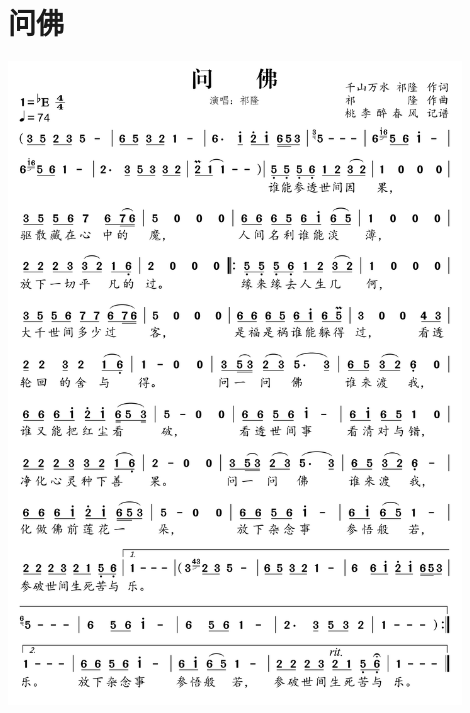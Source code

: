 \documentclass[cn,pad,twocol]{elegantbook}
\begin{document}
\section{问佛} \includegraphics[width=0.9\textwidth]{rpi400/20210212问佛.png}
\end{document}
